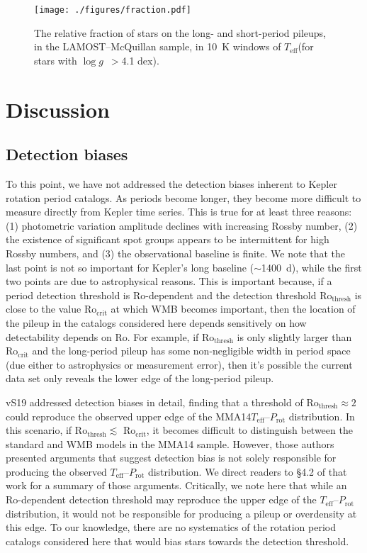 \documentclass[trackchanges,twocolumn]{aastex631}
\newcommand{\rocrit}{$\mathrm{Ro_{crit}}$\xspace}
\newcommand{\rothresh}{$\mathrm{Ro_{thresh}}$\xspace}
\newcommand{\lamostmcq}{LAMOST--McQuillan\xspace}
\newcommand{\jvs}{vS19\xspace}
\newcommand{\mma}{MMA14\xspace}
\newcommand{\teff}{\ensuremath{T_{\mathrm{eff}}}\xspace}
\newcommand{\logg}{\ensuremath{\log g}\xspace}
\newcommand{\prot}{\ensuremath{P_\mathrm{rot}}\xspace}
\begin{document}
\begin{figure}
    \centering
    \texttt{[image: ./figures/fraction.pdf]}
    \caption{The relative fraction of stars on the long- and short-period pileups, in the \lamostmcq sample, in 10~K windows of \teff (for stars with \logg~$>$4.1 dex).}
    \label{fig:fraction}
\end{figure}



\newpage
\section{Discussion} \label{sec:discussion}

\subsection{Detection biases}
\label{subsec:detectionbias}
To this point, we have not addressed the detection biases inherent to Kepler rotation period catalogs. As periods become longer, they become more difficult to measure directly from Kepler time series. This is true for at least three reasons: (1) photometric variation amplitude declines with increasing Rossby number, (2) the existence of significant spot groups appears to be intermittent for high Rossby numbers, and (3) the observational baseline is finite. We note that the last point is not so important for Kepler's long baseline ($\sim$1400~d), while the first two points are due to astrophysical reasons. This is important because, if a period detection threshold is Ro-dependent and the detection threshold Ro$_\mathrm{thresh}$ is close to the value \rocrit at which WMB becomes important, then the location of the pileup in the catalogs considered here depends sensitively on how detectability depends on Ro. For example, if Ro$_\mathrm{thresh}$ is only slightly larger than \rocrit and the long-period pileup has some non-negligible width in period space (due either to astrophysics or measurement error), then it's possible the current data set only reveals the lower edge of the long-period pileup.

\jvs addressed detection biases in detail, finding that a threshold of Ro$_\mathrm{thresh} \approx 2$ could reproduce the observed upper edge of the \mma \teff–\prot distribution. In this scenario, if \rothresh $\lesssim$ \rocrit, it becomes difficult to distinguish between the standard and WMB models in the \mma sample. However, those authors presented arguments that suggest detection bias is not solely responsible for producing the observed \teff–\prot distribution. We direct readers to \S4.2 of that work for a summary of those arguments. Critically, we note here that while an Ro-dependent detection threshold may reproduce the upper edge of the \teff–\prot distribution, it would not be responsible for producing a pileup or overdensity at this edge. To our knowledge, there are no systematics of the rotation period catalogs considered here that would bias stars towards the detection threshold.
\end{document}
